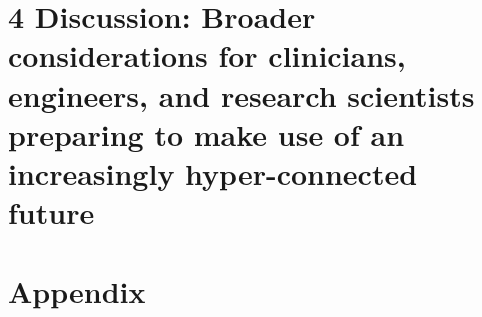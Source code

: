 \documentclass[
  12pt,
  lettersizepaper,
]{book}
\begin{document}
\hypertarget{sec:discussion-broader-considerations-for-clinicians-engineers-and-research-scientists-preparing-to-make-use-of-an-increasingly-hyper-connected-future}{%
\chapter{4 Discussion: Broader considerations for clinicians, engineers,
and research scientists preparing to make use of an increasingly
hyper-connected
future}\label{sec:discussion-broader-considerations-for-clinicians-engineers-and-research-scientists-preparing-to-make-use-of-an-increasingly-hyper-connected-future}}

\hypertarget{sec:appendix}{%
\chapter*{Appendix}\label{sec:appendix}}
\end{document}
